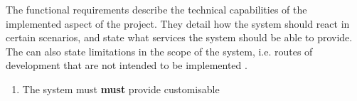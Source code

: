 
The functional requirements describe the technical capabilities of the implemented aspect of the project.
They detail how the system should react in certain scenarios, and state what services the system should be able to provide.
The can also state limitations in the scope of the system, i.e. routes of development that are not intended to be implemented \cite{software_engineering_req_analysis}.

\begin{enumerate}[label=\textbf{F\arabic*:}]
  \item The system must \textbf{must} provide customisable 
\end{enumerate}


